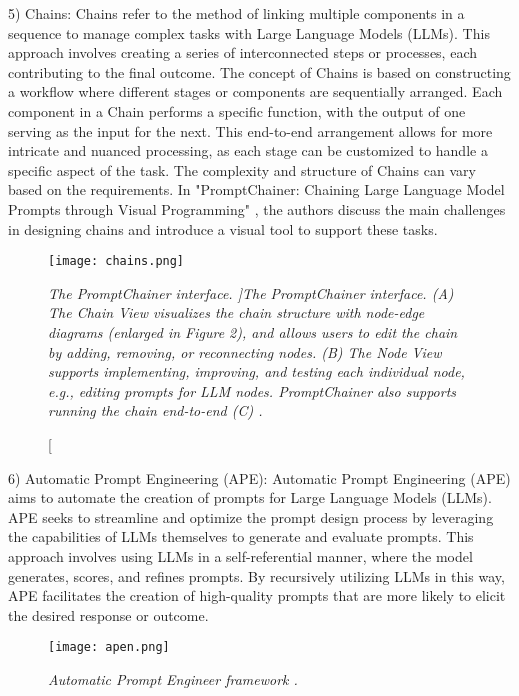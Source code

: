 \hfill

5) Chains: Chains refer to the method of linking multiple components in a sequence to manage complex tasks with Large Language Models (LLMs). This approach involves creating a series of interconnected steps or processes, each contributing to the final outcome. The concept of Chains is based on constructing a workflow where different stages or components are sequentially arranged. Each component in a Chain performs a specific function, with the output of one serving as the input for the next. This end-to-end arrangement allows for more intricate and nuanced processing, as each stage can be customized to handle a specific aspect of the task. The complexity and structure of Chains can vary based on the requirements. In "PromptChainer: Chaining Large Language Model Prompts through Visual Programming" \cite{wu2022promptchainer}, the authors discuss the main challenges in designing chains and introduce a visual tool to support these tasks.

\begin{figure}[H]
    \centering
    \texttt{[image: chains.png]}
    \caption[        \it{The PromptChainer interface.}
    ]{\it{The PromptChainer interface. (A) The Chain View visualizes the chain structure with node-edge diagrams (enlarged
            in Figure 2), and allows users to edit the chain by adding, removing, or reconnecting nodes. (B) The Node View supports implementing, improving, and testing each individual node, e.g., editing prompts for LLM nodes. PromptChainer also supports
            running the chain end-to-end (C) \cite{wu2022promptchainer}.}}
\end{figure}

\hfill

6) Automatic Prompt Engineering (APE): Automatic Prompt Engineering (APE) \cite{zhou2023large} aims to automate the creation of prompts for Large Language Models (LLMs). APE seeks to streamline and optimize the prompt design process by leveraging the capabilities of LLMs themselves to generate and evaluate prompts. This approach involves using LLMs in a self-referential manner, where the model generates, scores, and refines prompts. By recursively utilizing LLMs in this way, APE facilitates the creation of high-quality prompts that are more likely to elicit the desired response or outcome.

\begin{figure}[H]
    \centering
    \texttt{[image: apen.png]}
    \caption{\it{Automatic Prompt Engineer framework \cite{zhou2023large}.}}
\end{figure}